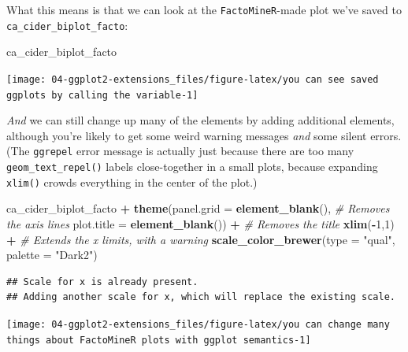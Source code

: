 \documentclass[
]{book}
\newenvironment{Shaded}{\begin{snugshade}}{\end{snugshade}}
\newcommand{\AttributeTok}[1]{\textcolor[rgb]{0.13,0.29,0.53}{#1}}
\newcommand{\CommentTok}[1]{\textcolor[rgb]{0.56,0.35,0.01}{\textit{#1}}}
\newcommand{\DecValTok}[1]{\textcolor[rgb]{0.00,0.00,0.81}{#1}}
\newcommand{\FunctionTok}[1]{\textcolor[rgb]{0.13,0.29,0.53}{\textbf{#1}}}
\newcommand{\NormalTok}[1]{#1}
\newcommand{\SpecialCharTok}[1]{\textcolor[rgb]{0.81,0.36,0.00}{\textbf{#1}}}
\newcommand{\StringTok}[1]{\textcolor[rgb]{0.31,0.60,0.02}{#1}}
\begin{document}
What this means is that we can look at the \texttt{FactoMineR}-made plot we've saved to \texttt{ca\_cider\_biplot\_facto}:

\begin{Shaded}
\begin{Highlighting}[]
\NormalTok{ca\_cider\_biplot\_facto}
\end{Highlighting}
\end{Shaded}

\begin{center}\texttt{[image: 04-ggplot2-extensions\_files/figure-latex/you can see saved ggplots by calling the variable-1]} \end{center}

\emph{And} we can still change up many of the elements by adding additional elements, although you're likely to get some weird warning messages \emph{and} some silent errors. (The \texttt{ggrepel} error message is actually just because there are too many \texttt{geom\_text\_repel()} labels close-together in a small plots, because expanding \texttt{xlim()} crowds everything in the center of the plot.)

\begin{Shaded}
\begin{Highlighting}[]
\NormalTok{ca\_cider\_biplot\_facto }\SpecialCharTok{+}
  \FunctionTok{theme}\NormalTok{(}\AttributeTok{panel.grid =} \FunctionTok{element\_blank}\NormalTok{(), }\CommentTok{\# Removes the axis lines}
        \AttributeTok{plot.title =} \FunctionTok{element\_blank}\NormalTok{()) }\SpecialCharTok{+} \CommentTok{\# Removes the title}
  \FunctionTok{xlim}\NormalTok{(}\SpecialCharTok{{-}}\DecValTok{1}\NormalTok{,}\DecValTok{1}\NormalTok{) }\SpecialCharTok{+} \CommentTok{\# Extends the x limits, with a warning}
  \FunctionTok{scale\_color\_brewer}\NormalTok{(}\AttributeTok{type =} \StringTok{"qual"}\NormalTok{, }\AttributeTok{palette =} \StringTok{"Dark2"}\NormalTok{)}
\end{Highlighting}
\end{Shaded}

\begin{verbatim}
## Scale for x is already present.
## Adding another scale for x, which will replace the existing scale.
\end{verbatim}

\begin{center}\texttt{[image: 04-ggplot2-extensions\_files/figure-latex/you can change many things about FactoMineR plots with ggplot semantics-1]} \end{center}
\end{document}
